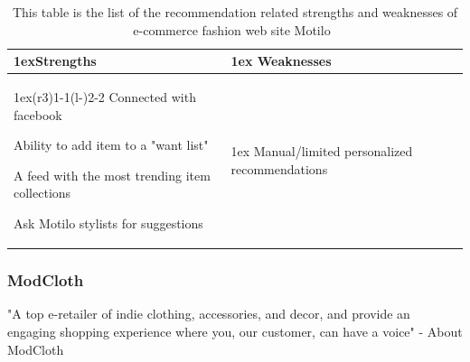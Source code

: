     \begin{table}[H]
    \centering
    \begin{tabularx}{\linewidth}{>{\parskip1ex}X@{\kern4\tabcolsep}>{\parskip1ex}X}
        \toprule
        \hfil\bfseries Strengths
        &
        \hfil\bfseries Weaknesses
            \\\cmidrule(r{3\tabcolsep}){1-1}\cmidrule(l{-\tabcolsep}){2-2}
            Connected with facebook \par
            Ability to add item to a "want list" \par
            A feed with the most trending item collections \par
            Ask Motilo stylists for suggestions \par
            &
            Manual/limited personalized recommendations \par
            \\\bottomrule
            \end{tabularx}
            \caption[Recommendation related strengths and weaknesses of Motilo~\cite{motilo}]{This table is the list of the recommendation related strengths and weaknesses of e-commerce fashion web site Motilo~\cite{motilo}}
            \label{table:ecommenreceMotilo}
        \end{table}

\subsubsection{ModCloth} %
\label{par:modcloth}
    "A top e-retailer of indie clothing, accessories, and decor, and provide an engaging shopping experience where you, our customer, can have a voice" - About ModCloth~\cite{modcloth}


